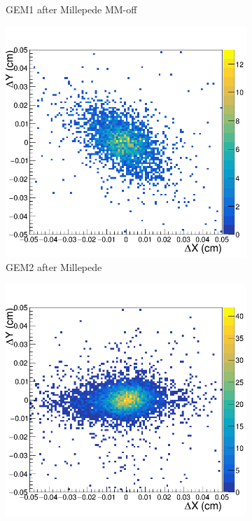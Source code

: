 \begin{figure}[h!]
\begin{subfigure}[r]{.45\textwidth}
  \caption{GEM1 after Millepede MM-off}
  \label{fig:GEM1_MXoff}
\end{subfigure}
\hfill
\begin{subfigure}[l]{.45\textwidth}
  \centering
  \includegraphics[width=\linewidth]{thesis_figures/alignment/Run_3211_after_millepede/square/GEM2.png}
  \caption{GEM2 after Millepede}
\end{subfigure}
\begin{subfigure}[r]{.45\textwidth}
  \centering
  \includegraphics[width=\linewidth]{thesis_figures/alignment/Run_3211_after_millepede/Micromegas_off/GEM2.png}

\end{subfigure}
\end{figure}
